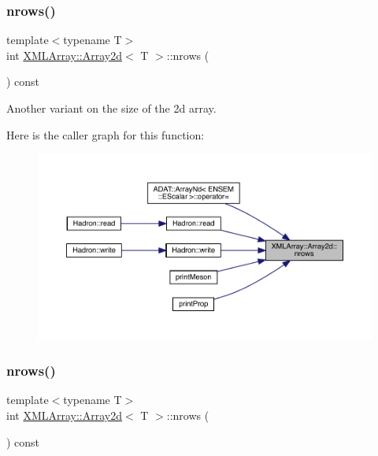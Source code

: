 \mbox{\label{classXMLArray_1_1Array2d_a05ca0ef1e6fdbafb2c7cc575f9c3081c}} 
\subsubsection{\texorpdfstring{nrows()}{nrows()}\hspace{0.1cm}{\footnotesize\ttfamily [1/2]}}
{\footnotesize\ttfamily template$<$typename T$>$ \\
int \mbox{\hyperlink{classXMLArray_1_1Array2d}{X\+M\+L\+Array\+::\+Array2d}}$<$ T $>$\+::nrows (\begin{DoxyParamCaption}{ }\end{DoxyParamCaption}) const\hspace{0.3cm}{\ttfamily [inline]}}



Another variant on the size of the 2d array. 

Here is the caller graph for this function\+:\nopagebreak
\begin{figure}[H]
\begin{center}
\leavevmode
\includegraphics[width=350pt]{dc/ddc/classXMLArray_1_1Array2d_a05ca0ef1e6fdbafb2c7cc575f9c3081c_icgraph}
\end{center}
\end{figure}
\mbox{\label{classXMLArray_1_1Array2d_a05ca0ef1e6fdbafb2c7cc575f9c3081c}} 
\subsubsection{\texorpdfstring{nrows()}{nrows()}\hspace{0.1cm}{\footnotesize\ttfamily [2/2]}}
{\footnotesize\ttfamily template$<$typename T$>$ \\
int \mbox{\hyperlink{classXMLArray_1_1Array2d}{X\+M\+L\+Array\+::\+Array2d}}$<$ T $>$\+::nrows (\begin{DoxyParamCaption}{ }\end{DoxyParamCaption}) const\hspace{0.3cm}{\ttfamily [inline]}}



